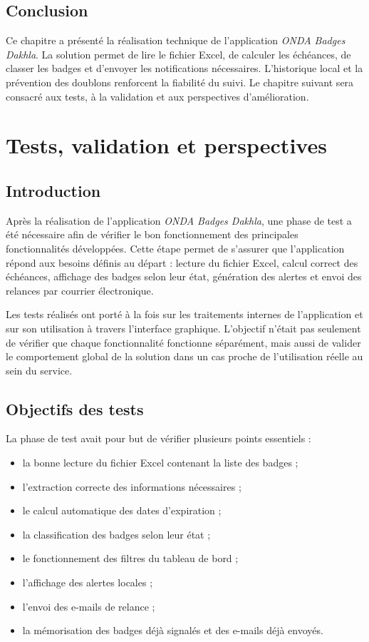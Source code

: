 \documentclass[12pt,a4paper,openany]{report}
\begin{document}
\section{Conclusion}

Ce chapitre a présenté la réalisation technique de l'application
\textit{ONDA Badges Dakhla}. La solution permet de lire le fichier Excel, de
calculer les échéances, de classer les badges et d'envoyer les notifications
nécessaires. L'historique local et la prévention des doublons renforcent la
fiabilité du suivi. Le chapitre suivant sera consacré aux tests, à la validation
et aux perspectives d'amélioration.

\chapter{Tests, validation et perspectives}

\section{Introduction}

Après la réalisation de l'application \textit{ONDA Badges Dakhla}, une phase de
test a été nécessaire afin de vérifier le bon fonctionnement des principales
fonctionnalités développées. Cette étape permet de s'assurer que l'application
répond aux besoins définis au départ : lecture du fichier Excel, calcul correct
des échéances, affichage des badges selon leur état, génération des alertes et
envoi des relances par courrier électronique.

Les tests réalisés ont porté à la fois sur les traitements internes de
l'application et sur son utilisation à travers l'interface graphique. L'objectif
n'était pas seulement de vérifier que chaque fonctionnalité fonctionne
séparément, mais aussi de valider le comportement global de la solution dans un
cas proche de l'utilisation réelle au sein du service.

\section{Objectifs des tests}

La phase de test avait pour but de vérifier plusieurs points essentiels :

\begin{itemize}
    \item la bonne lecture du fichier Excel contenant la liste des badges ;
    \item l'extraction correcte des informations nécessaires ;
    \item le calcul automatique des dates d'expiration ;
    \item la classification des badges selon leur état ;
    \item le fonctionnement des filtres du tableau de bord ;
    \item l'affichage des alertes locales ;
    \item l'envoi des e-mails de relance ;
    \item la mémorisation des badges déjà signalés et des e-mails déjà envoyés.
\end{itemize}
\end{document}
